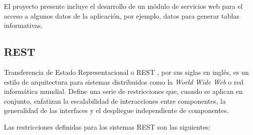     El proyecto presente incluye el desarrollo de un módulo de servicios web para el acceso a algunos datos de la aplicación, por ejemplo, datos para generar tablas informativas.

    \subsection{REST}
    Transferencia de Estado Representacional o REST \cite{restFielding}, por sus siglas en inglés, es un estilo de arquitectura para sistemas distribuidos como la \textit{World Wide Web} o red informática mundial. Define una serie de restricciones que, cuando se aplican en conjunto, enfatizan la escalabilidad de interacciones entre componentes, la generalidad de las interfaces y el despliegue independiente de componentes.

    Las restricciones definidas para los sistemas REST son las siguientes:

